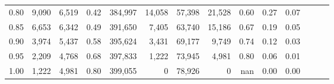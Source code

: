\begin{tabular}{rrrrrrrrrrrrrr}
0.80 &   9,090 &  6,519 &  0.42 &  384,997 &   14,058 &  57,398 &  21,528 &  0.60 &  0.27 &      0.07 \\
0.85 &   6,653 &  6,342 &  0.49 &  391,650 &    7,405 &  63,740 &  15,186 &  0.67 &  0.19 &      0.05 \\
0.90 &   3,974 &  5,437 &  0.58 &  395,624 &    3,431 &  69,177 &   9,749 &  0.74 &  0.12 &      0.03 \\
0.95 &   2,209 &  4,768 &  0.68 &  397,833 &    1,222 &  73,945 &   4,981 &  0.80 &  0.06 &      0.01 \\
1.00 &   1,222 &  4,981 &  0.80 &  399,055 &        0 &  78,926 &       0 &   nan &  0.00 &      0.00 \\
\bottomrule
\end{tabular}
